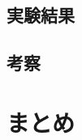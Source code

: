 \documentclass[12pt,twoside]{jbook}
\begin{document}
\section{実験結果}

\section{考察}



\chapter{まとめ}




%
%




\appendix
\end{document}
